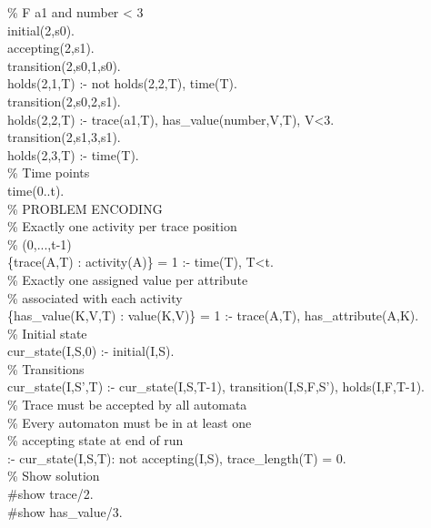 \begin{small}
\begin{aspcode}
\noindent
\% F a1 and number < 3\\
initial(2,s0).\\
accepting(2,s1).\\
transition(2,s0,1,s0).\\
holds(2,1,T) :- not holds(2,2,T), time(T).\\
transition(2,s0,2,s1).\\
holds(2,2,T) :- trace(a1,T), has\_value(number,V,T), V<3.\\
transition(2,s1,3,s1).\\
holds(2,3,T) :- time(T).\\

\noindent
\% Time points\\
time(0..t). \\

\noindent
\% PROBLEM ENCODING\\

\noindent
\% Exactly one activity per trace position\\ 
\% (0,...,t-1)\\
\{trace(A,T) : activity(A)\} = 1 :- time(T), T<t.\\

\noindent
\% Exactly one assigned value per attribute\\ 
\% associated with each activity\\
\{has\_value(K,V,T) : value(K,V)\} = 1 :- trace(A,T), has\_attribute(A,K).\\

\noindent
\% Initial state\\
cur\_state(I,S,0) :- initial(I,S).\\

\noindent
\% Transitions\\
cur\_state(I,S',T) :- cur\_state(I,S,T-1), transition(I,S,F,S'), holds(I,F,T-1).\\

\noindent
\% Trace must be accepted by all automata\\
\% Every automaton must be in at least one\\ 
\% accepting state at end of run\\
:- {cur\_state(I,S,T): not accepting(I,S), trace\_length(T)} = 0.\\

\noindent
\% Show solution\\
\#show trace/2.\\
\#show has\_value/3.\\
\end{aspcode}
\end{small}


